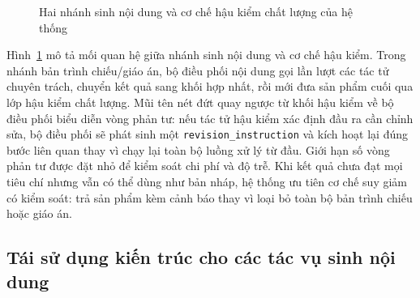 \documentclass[../DoAn.tex]{subfiles}
\begin{document}
\begin{figure}[H]
{
}
\caption{Hai nhánh sinh nội dung và cơ chế hậu kiểm chất lượng của hệ thống}
\label{fig:method-generation-quality}
\end{figure}

Hình~\ref{fig:method-generation-quality} mô tả mối quan hệ giữa nhánh sinh nội dung và cơ chế hậu kiểm. Trong nhánh bản trình chiếu/giáo án, bộ điều phối nội dung gọi lần lượt các tác tử chuyên trách, chuyển kết quả sang khối hợp nhất, rồi mới đưa sản phẩm cuối qua lớp hậu kiểm chất lượng. Mũi tên nét đứt quay ngược từ khối hậu kiểm về bộ điều phối biểu diễn vòng phản tư: nếu tác tử hậu kiểm xác định đầu ra cần chỉnh sửa, bộ điều phối sẽ phát sinh một \texttt{revision\_instruction} và kích hoạt lại đúng bước liên quan thay vì chạy lại toàn bộ luồng xử lý từ đầu. Giới hạn số vòng phản tư được đặt nhỏ để kiểm soát chi phí và độ trễ. Khi kết quả chưa đạt mọi tiêu chí nhưng vẫn có thể dùng như bản nháp, hệ thống ưu tiên cơ chế suy giảm có kiểm soát: trả sản phẩm kèm cảnh báo thay vì loại bỏ toàn bộ bản trình chiếu hoặc giáo án.

\subsection{Tái sử dụng kiến trúc cho các tác vụ sinh nội dung}
\end{document}
